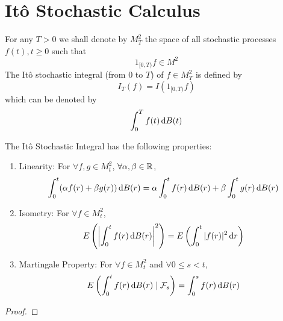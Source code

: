 \section{It\^o Stochastic Calculus}

\begin{definition}
	For any \(T>0\) we shall denote by \(M_{T}^{2}\) the space of all stochastic processes \(f(t), t \geq 0\) such that
	\begin{equation*}
		1_{[0,T)}f\in M^{2}
	\end{equation*}
	The It\^o stochastic integral (from \(0\) to \(T\)) of \(f\in M_{T}^{2}\) is defined by
	\begin{equation}
		I_{T}(f)=I\left(1_{[0,T)}f\right)
	\end{equation}
	which can be denoted by
	\begin{equation}
		\int_{0}^{T}f(t)\mathop{}\!\mathrm{d} B(t)
	\end{equation}
\end{definition}

\begin{property}
	The It\^o Stochastic Integral has the following properties:
	\begin{enumerate}
		\item Linearity: For \(\forall f,g\in M_{t}^{2}\), \(\forall \alpha,\beta\in\mathbb{R}\),
		      \begin{equation}
			      \int_{0}^{t}(\alpha f(r)+\beta g(r))\mathop{}\!\mathrm{d} B(r)=\alpha \int_{0}^{t}f(r)\mathop{}\!\mathrm{d} B(r)+\beta\int_{0}^{t}g(r)\mathop{}\!\mathrm{d} B(r)
		      \end{equation}
		\item Isometry: For \(\forall f\in M_{t}^{2}\),
		      \begin{equation}
			      E\left(\left|\int_{0}^{t}f(r)\mathop{}\!\mathrm{d} B(r)\right|^{2}\right)=E\left(\int_{0}^{t}|f(r)|^{2}\mathop{}\!\mathrm{d} r\right)
		      \end{equation}
		\item Martingale Property: For \(\forall f\in M_{t}^{2}\) and  \(\forall 0\leq s<t\),
		      \begin{equation}
			      E\left(\int_{0}^{t}f(r)\mathop{}\!\mathrm{d} B(r)\mid\mathcal{F}_{s}\right)=\int_{0}^{s}f(r)\mathop{}\!\mathrm{d} B(r)
		      \end{equation}
	\end{enumerate}
\end{property}

\begin{proof}

\end{proof}

